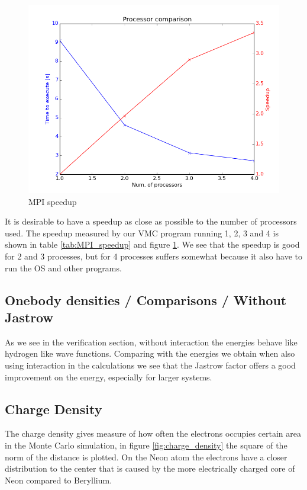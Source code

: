 \documentclass[11pt]{article}
\begin{document}
		\begin{figure}
		\centering \includegraphics[width=0.45\linewidth]{figures/processor_number_time_comparison}
		\protect\caption{MPI speedup}
		\label{fig:MPI_speedup}
		\end{figure}

		It is desirable to have a speedup as close as possible to the number of processors used. The speedup measured by our VMC program running 1, 2, 3 and 4 is shown in table \ref{tab:MPI_speedup} and figure \ref{fig:MPI_speedup}. We see that the speedup is good for 2 and 3 processes, but for 4 processes suffers somewhat because it also have to run the OS and other programs.

	\subsection{Onebody densities / Comparisons / Without Jastrow}
		As we see in the verification section, without interaction the energies behave like hydrogen like wave functions. Comparing with the energies we obtain when also using interaction in the calculations we see that the Jastrow factor offers a good improvement on the energy, especially for larger systems.

	\subsection{Charge Density}
		The charge density gives measure of how often the electrons occupies certain area in the Monte Carlo simulation, in figure \ref{fig:charge_density} the square of the norm of the distance is plotted. 
		On the Neon atom the electrons have a closer distribution to the center that is caused by the more electrically charged core of Neon compared to Beryllium. 
\end{document}
